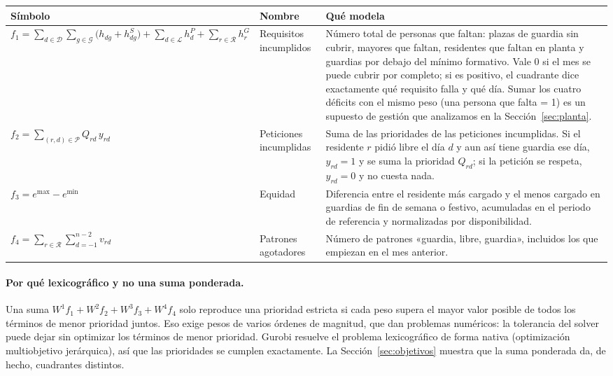 {\small
\begin{longtable}{@{}p{6.0cm}p{2.4cm}p{7.2cm}@{}}
\toprule
Símbolo & Nombre & Qué modela \\
\midrule
\endhead
$\displaystyle f_1 = \sum_{d \in \mathcal{D}} \sum_{g \in \mathcal{G}} \bigl(h_{dg} + h^{S}_{dg}\bigr) + \sum_{d \in \mathcal{L}} h^{P}_{d} + \sum_{r \in \mathcal{R}} h^{G}_{r}$ & Requisitos incumplidos & Número total de personas que faltan: plazas de guardia sin cubrir, mayores que faltan, residentes que faltan en planta y guardias por debajo del mínimo formativo. Vale 0 si el mes se puede cubrir por completo; si es positivo, el cuadrante dice exactamente qué requisito falla y qué día. Sumar los cuatro déficits con el mismo peso (una persona que falta = 1) es un supuesto de gestión que analizamos en la Sección~\ref{sec:planta}. \\[4pt]
$\displaystyle f_2 = \sum_{(r, d) \in \mathcal{P}} Q_{rd}\, y_{rd}$ & Peticiones incumplidas & Suma de las prioridades de las peticiones incumplidas. Si el residente $r$ pidió libre el día $d$ y aun así tiene guardia ese día, $y_{rd} = 1$ y se suma la prioridad $Q_{rd}$; si la petición se respeta, $y_{rd} = 0$ y no cuesta nada. \\[4pt]
$f_3 = e^{\max} - e^{\min}$ & Equidad & Diferencia entre el residente más cargado y el menos cargado en guardias de fin de semana o festivo, acumuladas en el periodo de referencia y normalizadas por disponibilidad. \\[4pt]
$\displaystyle f_4 = \sum_{r \in \mathcal{R}} \sum_{d = -1}^{n-2} v_{rd}$ & Patrones agotadores & Número de patrones «guardia, libre, guardia», incluidos los que empiezan en el mes anterior. \\
\bottomrule
\end{longtable}\addtocounter{table}{-1}%
}

\paragraph{Por qué lexicográfico y no una suma ponderada.} Una suma $W^1 f_1 + W^2 f_2 + W^3 f_3 + W^4 f_4$ solo reproduce una prioridad estricta si cada peso supera el mayor valor posible de todos los términos de menor prioridad juntos. Eso exige pesos de varios órdenes de magnitud, que dan problemas numéricos: la tolerancia del solver puede dejar sin optimizar los términos de menor prioridad. Gurobi resuelve el problema lexicográfico de forma nativa (optimización multiobjetivo jerárquica), así que las prioridades se cumplen exactamente. La Sección~\ref{sec:objetivos} muestra que la suma ponderada da, de hecho, cuadrantes distintos.

